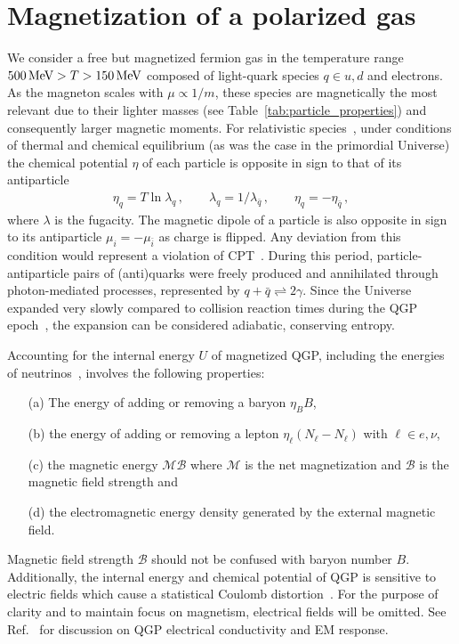 \documentclass[epjST]{svjour}
\newcommand*{\MeV}{\text{\,MeV}}
\begin{document}
\section{Magnetization of a polarized gas}
\label{sec:magnetization}
We consider a free but magnetized fermion gas in the temperature range \(500\MeV>T>150\MeV\) composed of light-quark species \(q \in {u,d}\) and electrons. As the magneton scales with \(\mu \propto 1/m\), these species are magnetically the most relevant due to their lighter masses (see Table~\ref{tab:particle_properties}) and consequently larger magnetic moments. For relativistic species~\cite{Elze:1980er}, under conditions of thermal and chemical equilibrium (as was the case in the primordial Universe) the chemical potential \(\eta\) of each particle is opposite in sign to that of its antiparticle
\begin{align}
    \eta_{q}=T\ln\lambda_{q}\,,\qquad
    \lambda_{q}=1/\lambda_{\bar{q}}\,,\qquad
    \eta_{q}=-\eta_{\bar{q}}\,,
\end{align}
where \(\lambda\) is the fugacity. The magnetic dipole of a particle is also opposite in sign to its antiparticle $\mu_{i}=-\mu_{\bar{i}}$ as charge is flipped. Any deviation from this condition would represent a violation of CPT~\cite{Colladay:1996iz,Bluhm:1997ci,BASE:2016yuo}. During this period, particle-antiparticle pairs of (anti)quarks were freely produced and annihilated through photon-mediated processes, represented by $q+\bar{q}\rightleftharpoons2\gamma$. Since the Universe expanded very slowly compared to collision reaction times during the QGP epoch~\cite{Rafelski:2023emw,Yang:2024ret}, the expansion can be considered adiabatic, conserving entropy.

Accounting for the internal energy $U$ of magnetized QGP, including the energies of neutrinos~\cite{Birrell:2014ona}, involves the following properties: 
\begin{itemize}
    \item[(a)] The energy of adding or removing a baryon $\eta_{B}B$,
    \item[(b)] the energy of adding or removing a lepton $\eta_{\ell}(N_{\ell}-N_{\ell})$ with $\ell\in {e,\nu}$, 
    \item[(c)] the magnetic energy $\mathcal{M}\mathcal{B}$ where $\mathcal{M}$ is the net magnetization and $\mathcal{B}$ is the magnetic field strength and
    \item[(d)] the electromagnetic energy density generated by the external magnetic field.
\end{itemize}
Magnetic field strength $\mathcal{B}$ should not be confused with baryon number $B$. Additionally, the internal energy and chemical potential of QGP is sensitive to electric fields which cause a statistical Coulomb distortion~\cite{Sigl:1996dm,Letessier:2002ony}. For the purpose of clarity and to maintain focus on magnetism, electrical fields will be omitted. See Ref.~\cite{Grayson:2022asf,Shovkovy:2022bnd,Ghosh:2024fkg} for discussion on QGP electrical conductivity and EM response.
\end{document}
